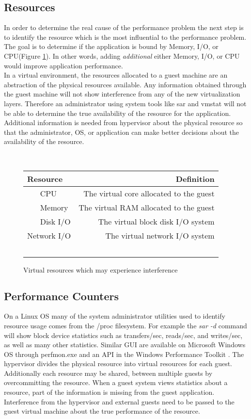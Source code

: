 \subsection{Resources}
In order to determine the real cause of the performance problem the next step is to identify the resource which is the most influential to the performance problem.  The goal is to determine if the application is bound by Memory, I/O, or CPU(Figure \ref{fig:resources}).  In other words, adding \emph{additional} either Memory, I/O, or CPU would improve application performance. \\
\indent In a virtual environment, the resources allocated to a guest machine are an abstraction of the physical resources available.   Any information obtained through the guest machine will not show interference from any of the new virtualization layers.  Therefore an administrator using system tools like sar and vmstat will not be able to determine the true availability of the resource for the application.  Additional information is needed from hypervisor about the physical resource so that the administrator, OS, or application can make better decisions about the availability of the resource. 
\begin{figure}
  \begin{tabular}{ l r }
    Resource & Definition \\
    \hline
    CPU & The virtual core allocated to the guest \\
    Memory & The virtual RAM allocated to the guest \\ 
    Disk I/O & The virtual block disk I/O system \\
    Network I/O & The virtual network I/O system \\
  \end{tabular}
\caption{Virtual resources which may experience interference}
\label{fig:resources}
\end{figure}

\subsection{Performance Counters}
On a Linux OS many of the system administrator utilities used to identify resource usage comes from the /proc filesystem. For example the \emph{sar -d} command will show block device statistics such as transfers/sec, reads/sec, and writes/sec, as well as many other statistics.  Similar GUI are available on Microsoft Windows OS through perfmon.exe and an API in the Windows Performance Toolkit \cite{winperf}. The hypervisor divides the physical resource into virtual resources for each guest.  Additionally each resource may be shared, between multiple guests by overcommitting the resource.  When a guest system views statistics about a resource, part of the information is missing from the guest application.  Interference from the hypervisor and external guests need to be passed to the guest virtual machine about the true performance of the resource. \\

